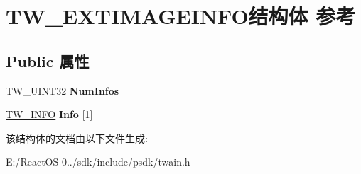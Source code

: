 \hypertarget{struct_t_w___e_x_t_i_m_a_g_e_i_n_f_o}{}\section{T\+W\+\_\+\+E\+X\+T\+I\+M\+A\+G\+E\+I\+N\+F\+O结构体 参考}
\label{struct_t_w___e_x_t_i_m_a_g_e_i_n_f_o}
\subsection*{Public 属性}
\begin{DoxyCompactItemize}
\item 
\mbox{\label{struct_t_w___e_x_t_i_m_a_g_e_i_n_f_o_af1ac6bdc6346955156965e940c885c5b}} 
T\+W\+\_\+\+U\+I\+N\+T32 {\bfseries Num\+Infos}
\item 
\mbox{\label{struct_t_w___e_x_t_i_m_a_g_e_i_n_f_o_af24f1fb7ad69629c9da3a77291bd8d0a}} 
\hyperlink{struct_t_w___i_n_f_o}{T\+W\+\_\+\+I\+N\+FO} {\bfseries Info} \mbox{[}1\mbox{]}
\end{DoxyCompactItemize}


该结构体的文档由以下文件生成\+:\begin{DoxyCompactItemize}
\item 
E\+:/\+React\+O\+S-\/0../sdk/include/psdk/twain.\+h\end{DoxyCompactItemize}
